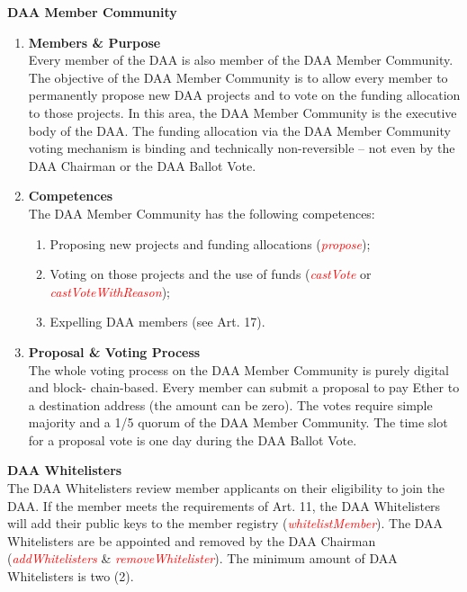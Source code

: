 \item \textbf{DAA Member Community} \\
\begin{enumerate}[label=\textbf{\arabic*.}]
    \item \textbf{Members \& Purpose} \\
    Every member of the DAA is also member of the DAA Member Community.
    The objective of the DAA Member Community is to allow every member to permanently propose new DAA projects and to vote on the funding allocation to those projects. %
    In this area, the DAA Member Community is the executive body of the DAA.
    The funding allocation via the DAA Member Community voting mechanism is binding and technically non-reversible – not even by the DAA Chairman or the DAA Ballot Vote.

    \item \textbf{Competences} \\
    The DAA Member Community has the following competences:
    \begin{enumerate}
        [label=(\alph*)]
        \item Proposing new projects and funding allocations (\textcolor{red}{\emph{propose}});
        \item Voting on those projects and the use of funds (\textcolor{red}{\emph{castVote}} or \textcolor{red}{\emph{castVoteWithReason}});
        \item Expelling DAA members (see Art. 17).
    \end{enumerate}

    \item \textbf{Proposal \& Voting Process} \\
    The whole voting process on the DAA Member Community is purely digital and block- chain-based.
    Every member can submit a proposal to pay Ether to a destination address (the amount can be zero).
    The votes require simple majority and a 1/5 quorum of the DAA Member Community.
    The time slot for a proposal vote is one day during the DAA Ballot Vote.
\end{enumerate}

\item \textbf{DAA Whitelisters} \\
The DAA Whitelisters review member applicants on their eligibility to join the DAA.
If the member meets the requirements of Art. 11, the DAA Whitelisters will add their public keys to the member registry (\textcolor{red}{\emph{whitelistMember}}).
The DAA Whitelisters are be appointed and removed by the DAA Chairman (\textcolor{red}{\emph{addWhitelisters}} \& \textcolor{red}{\emph{removeWhitelister}}).
The minimum amount of DAA Whitelisters is two (2).
